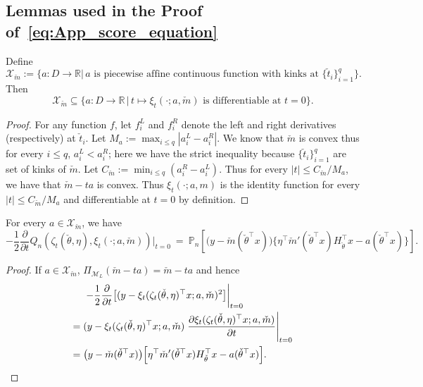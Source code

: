 \subsection[Lemmas used in the proof of (\ref{eq:App_score_equation})]{Lemmas used in the Proof of~\eqref{eq:App_score_equation}}
\begin{lemma}\label{lem:projection_is_identity}
Define
\[
\mathcal{X}_{\check{m}} := \{a:D\to\mathbb{R}|\, a\mbox{ is piecewise affine continuous function with kinks at }\{\check{t}_i\}_{i=1}^q\}.
\]
Then
\[
\mathcal{X}_{\check{m}} \subseteq \{a:D\to\mathbb{R}\,|\,t\mapsto\xi_t(\cdot; a, \check{m}) \text{ is differentiable at } t=0\}.
\]
\end{lemma}
\begin{proof}
For any function $f$, let $f^L_i$ and $ f^R_i$ denote the left and right derivatives (respectively) at $\check{t}_{i}$. Let $M_a := \max_{i\le q} |a^L_i- a^R_i|$. We know that $\check{m}$ is convex thus for every $i\le q$, $a^L_i <  a^R_i$; here we have the strict inequality because $\{\check{t}_i\}_{i=1}^q$ are set of kinks of $\check{m}$. Let $C_{\check{m}} := \min_{i\le q} (a^R_i- a^L_i)$. Thus for every $|t| \le C_{\check{m}}/M_a $, we have that $ \check{m}- t a $ is convex. Thus $\xi_t(\cdot; a,m)$ is the identity function for every $|t| \le C_{\check{m}}/M_a $ and differentiable at $t=0$ by definition. 
\end{proof}
\begin{lemma}\label{lem:deriv}
For every $a\in\mathcal{X}_{\check{m}}$, we have
\[
-\frac{1}{2}\frac{\partial}{\partial t}Q_n(\zeta_t(\check\theta,\eta), \xi_t(\cdot;a, \check{m}))\Big|_{t = 0} ~=~ \mathbb{P}_n\left[\big(y-\check{m}(\check\theta^\top x)\big)\Big\{ \eta^\top  \check{m}'(\check\theta ^\top x) H_{\check\theta}^\top x - a(\check\theta^\top x)\Big\}\right].
\]
\end{lemma}
\begin{proof}
If $a\in\mathcal{X}_{\check{m}}$, $\Pi_{\mathcal{M}_L}(\check{m} - t a) = \check{m} - t a$ and hence
\begin{align}\label{eq:score_eq_compu_at_a}
\begin{split}
&\left. -\frac{1}{2} \frac{\partial}{\partial t} \big[(y-\xi_t(\zeta_t(\check\theta, \eta)^\top x;  a, \check{m})^2\big]\right|_{t=0}\\
={}&(y-\xi_t(\zeta_t(\check\theta, \eta)^\top x;  a, \check{m}) \left.\frac{\partial \xi_t(\zeta_t(\check\theta, \eta)^\top x; a,\check{m})}{\partial t}\right|_{t=0}\\
={}&\big(y-\check{m}(\check\theta^\top x)\big)\Big[ \eta^\top  \check{m}'(\check\theta ^\top x) H_{\check\theta}^\top x - a(\check\theta^\top x)\Big].\qedhere
\end{split}
\end{align}
\end{proof}


